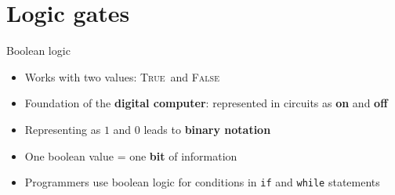\part{Logic gates}
\frame{\partpage}

\newcommand{\TT}{\textsc{True}}
\newcommand{\FF}{\textsc{False}}
\newcommand{\OP}[1]{\ \textsc{#1}\ }
\newcommand{\OPand}{\OP{and}}
\newcommand{\OPor}{\OP{or}}
\newcommand{\OPxor}{\OP{xor}}
\newcommand{\OPnand}{\OP{nand}}
\newcommand{\OPnor}{\OP{nor}}
\newcommand{\OPxnor}{\OP{xnor}}
\newcommand{\OPnot}{\textsc{not}\ }

\newcommand{\OPname}{}
\newcommand{\OPenglishA}{}
\newcommand{\OPenglishB}{}
\newcommand{\OPtable}{}
\newcommand{\OPdiagram}{}

\newcommand{\OPframe}[5]{
	\begin{frame}{#1}
		\pause
		\begin{center}
			#2 \par if and only if \par #3
		\end{center}
		\pause
		\begin{columns}
			\begin{column}{0.48\textwidth}
				\begin{center}
					#4
				\end{center}
			\end{column}
			\pause
			\begin{column}{0.48\textwidth}
				\begin{center}
					\begin{circuitikz} \draw[color=\circuitcolour]
						#5
					\end{circuitikz}
				\end{center}
			\end{column}
		\end{columns}
	\end{frame}
}

\begin{frame}{Boolean logic}
	\begin{itemize}
		\pause\item Works with two values: \TT\ and \FF
		\pause\item Foundation of the \textbf{digital computer}:
			represented in circuits as \textbf{on} and \textbf{off}
		\pause\item Representing as $1$ and $0$ leads to \textbf{binary notation}
		\pause\item One boolean value = one \textbf{bit} of information
		\pause\item Programmers use boolean logic for conditions in \lstinline{if} and \lstinline{while}
			statements
	\end{itemize}
\end{frame}

